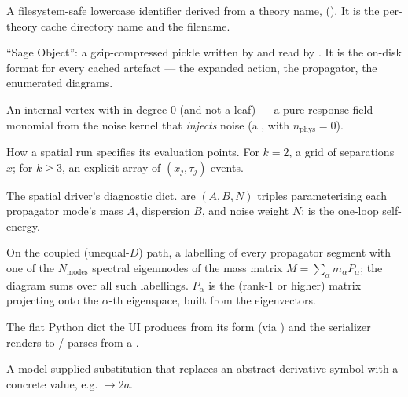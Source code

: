 \begin{description}[leftmargin=0pt,style=nextline]
  \item[Slug / slugify] A filesystem-safe lowercase identifier derived from a theory
        name, 
        (). It is the per-theory cache
        directory name and the  filename.

  \item[\code{.sobj}] ``Sage Object'': a gzip-compressed pickle written by
         and read by . It is the on-disk
        format for every cached artefact --- the expanded action, the propagator, the
        enumerated diagrams.

  \item[Source / source vertex] An internal vertex with in-degree $0$ (and not a
        leaf) --- a pure response-field monomial from the noise kernel that
        \emph{injects} noise (a , with $n_{\mathrm{phys}}=0$).

  \item[\code{spatial\_grid} / \code{spatial\_points}] How a spatial run specifies its
        evaluation points. For $k=2$, a grid of separations $x$; for $k\ge 3$, an
        explicit  array of $(x_j,\tau_j)$ events.

  \item[\code{spatial\_info} / modes / \code{Sigma}] The spatial driver's diagnostic
        dict.  are $(A,B,N)$ triples parameterising each propagator
        mode's mass $A$, dispersion $B$, and noise weight $N$;  is the
        one-loop self-energy.

  \item[Spectral assignment / spectral projector $P_\alpha$] On the coupled
        (unequal-$D$) path, a labelling of every propagator segment with one of the
        $N_{\mathrm{modes}}$ spectral eigenmodes of the mass matrix $M=\sum_\alpha
        m_\alpha P_\alpha$; the diagram sums over all such labellings. $P_\alpha$ is
        the (rank-1 or higher) matrix projecting onto the $\alpha$-th eigenspace,
        built from the eigenvectors.

  \item[Spec dict] The flat Python dict the UI produces from its form (via
        ) and the serializer renders to / parses from a
        .

  \item[Specialization] A model-supplied substitution that replaces an abstract
        derivative symbol with a concrete value, e.g.  $\to 2a$.


\end{description}
